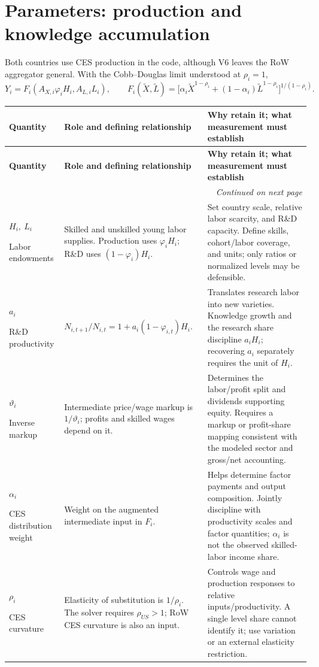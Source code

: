 \documentclass[10pt,a4paper,landscape]{article}
\makeatletter
\newenvironment{coretable}{%
\begin{longtable}{@{}P{\dimexpr .19\textwidth-3.8pt\relax}P{\dimexpr .35\textwidth-7pt\relax}P{\dimexpr .46\textwidth-9.2pt\relax}@{}}
\toprule
\rowcolor{tablehead}\textbf{Quantity} & \textbf{Role and defining relationship} & \textbf{Why retain it; what measurement must establish}\\
\midrule
\endfirsthead
\toprule
\rowcolor{tablehead}\textbf{Quantity} & \textbf{Role and defining relationship} & \textbf{Why retain it; what measurement must establish}\\
\midrule
\endhead
\midrule\multicolumn{3}{r}{\footnotesize\itshape Continued on next page}\\
\endfoot
\bottomrule
\endlastfoot
}{\end{longtable}}
\makeatother
\begin{document}
\clearpage
\section{Parameters: production and knowledge accumulation}
Both countries use CES production in the code, although V6 leaves the RoW aggregator general. With the Cobb--Douglas limit understood at $\rho_i=1$,
\[
Y_i=F_i(A_{X,i}\varphi_iH_i,A_{L,i}L_i),\qquad
F_i(\widetilde X,\widetilde L)=
\big[\alpha_i\widetilde X^{1-\rho_i}+(1-\alpha_i)\widetilde L^{1-\rho_i}\big]^{1/(1-\rho_i)}.
\]
\begin{coretable}
$H_i,\ L_i$\par Labor endowments & Skilled and unskilled young labor supplies. Production uses $\varphi_iH_i$; R\&D uses $(1-\varphi_i)H_i$. & Set country scale, relative labor scarcity, and R\&D capacity. Define skills, cohort/labor coverage, and units; only ratios or normalized levels may be defensible.\\[4pt]
$a_i$\par R\&D productivity & $N_{i,t+1}/N_{i,t}=1+a_i(1-\varphi_{i,t})H_i$. & Translates research labor into new varieties. Knowledge growth and the research share discipline $a_iH_i$; recovering $a_i$ separately requires the unit of $H_i$.\\[4pt]
$\vartheta_i$\par Inverse markup & Intermediate price/wage markup is $1/\vartheta_i$; profits and skilled wages depend on it. & Determines the labor/profit split and dividends supporting equity. Requires a markup or profit-share mapping consistent with the modeled sector and gross/net accounting.\\[4pt]
$\alpha_i$\par CES distribution weight & Weight on the augmented intermediate input in $F_i$. & Helps determine factor payments and output composition. Jointly discipline with productivity scales and factor quantities; $\alpha_i$ is not the observed skilled-labor income share.\\[4pt]
$\rho_i$\par CES curvature & Elasticity of substitution is $1/\rho_i$. The solver requires $\rho_{US}>1$; RoW CES curvature is also an input. & Controls wage and production responses to relative inputs/productivity. A single level share cannot identify it; use variation or an external elasticity restriction.\\[4pt]

\end{coretable}
\end{document}
